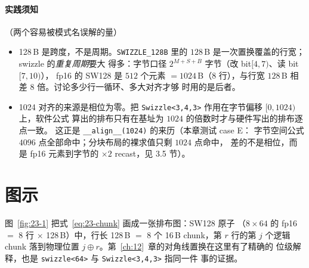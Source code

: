 \paragraph{实践须知}（两个容易被模式名误解的量）
\begin{itemize}
  \item 128\,B 是跨度，不是周期。\texttt{SWIZZLE\_\allowbreak{}128\allowbreak{}B} 里的
        $128$\,B 是一次置换覆盖的行宽；swizzle 的\emph{重复周期}要大
        得多：字节口径 $2^{M+S+B}$ 字节（改 bit$[4,7)$、读 bit$[7,10)$），
        fp16 的 SW128 是 $512$ 个元素 $=1024$\,B（$8$ 行），与行宽
        $128$\,B 相差 $8$ 倍。讨论多少行一循环、多大对齐才够
        时用的是后者。
  \item 1024 对齐的来源是相位为零。把
        \texttt{Swizzle\allowbreak{}<3,\allowbreak{}4,\allowbreak{}3>} 作用在字节偏移 $[0,1024)$ 上，软件公式
        算出的排布只有在基址为 $1024$ 的倍数时才与硬件写出的排布逐点一致。
        这正是 \texttt{\_\allowbreak{}\_\allowbreak{}align\_\allowbreak{}\_\allowbreak{}(1024)} 的来历（本章测试 case E：
        字节空间公式 $4096$ 点全部命中；分块布局的裸求值只剩 $1024$ 点命中，
        差的不是相位，而是 fp16 元素到字节的 $\times2$ recast，见
        3.5 节）。
\end{itemize}

\needspace{96mm}

\section{图示}

图~\ref{fig:23-1} 把式~\eqref{eq:23-chunk} 画成一张排布图：SW128 原子
（$8\times64$ 的 fp16 $=$ 8 行 $\times$ 128\,B）中，行长 128\,B $=$
8 个 16\,B chunk，第 $r$ 行的第 $j$ 个逻辑 chunk 落到物理位置
$j\oplus r$。第~\ref{ch:12}~章的对角线置换在这里有了精确的
位级解释，也是 \texttt{swizzle<64>} 与 \texttt{Swizzle\allowbreak{}<3,\allowbreak{}4,\allowbreak{}3>} 指同一件
事的证据。

